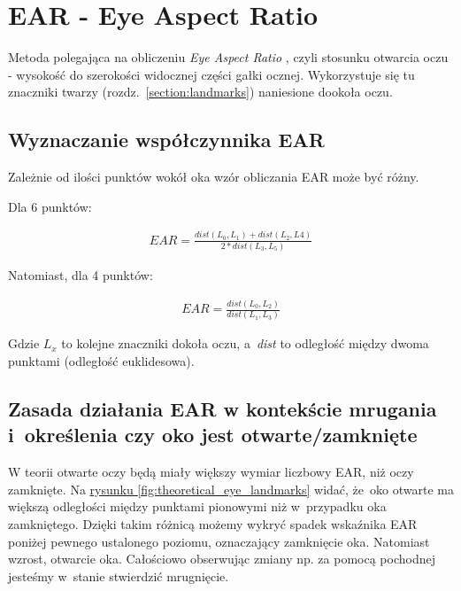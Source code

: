 \newpage

\section{EAR - Eye Aspect Ratio} \label{section:EARsection}

Metoda polegająca na obliczeniu \textit{Eye Aspect Ratio} \cite{EARRaspberryPi} \cite{eyeBlinkEARRosebrock}, czyli stosunku otwarcia oczu - wysokość do szerokości widocznej części gałki ocznej. Wykorzystuje się tu znaczniki twarzy (rozdz.~\hyperref[{section:landmarks}]{\ref{section:landmarks}}) naniesione dookoła oczu.


\subsection{Wyznaczanie współczynnika EAR}

Zależnie od ilości punktów wokół oka wzór obliczania EAR może być różny.

\par

Dla 6 punktów:

\begin{align}
    EAR = \frac{dist(L_0, L_1) + dist(L_2, L4)}{2 * dist(L_3, L_5)}
\end{align}

Natomiast, dla 4 punktów:

\begin{align}
    EAR = \frac{dist(L_0, L_2)}{dist(L_1, L_3)}
\end{align}

Gdzie \textit{$L_x$} to kolejne znaczniki dokoła oczu, a~\textit{dist} to odległość między dwoma punktami (odległość euklidesowa).


\subsection{Zasada działania EAR w kontekście mrugania i~określenia czy oko jest otwarte/zamknięte}

W teorii otwarte oczy będą miały większy wymiar liczbowy EAR, niż oczy zamknięte. Na \hyperref[{fig:theoretical_eye_landmarks}]{rysunku \ref{fig:theoretical_eye_landmarks}} widać, że~oko otwarte ma większą odległości między punktami pionowymi niż w~przypadku oka zamkniętego. Dzięki takim różnicą możemy wykryć spadek wskaźnika EAR poniżej pewnego ustalonego poziomu, oznaczający zamknięcie oka. Natomiast wzrost, otwarcie oka. Całościowo obserwując zmiany np. za pomocą pochodnej jesteśmy w~stanie stwierdzić mrugnięcie.

